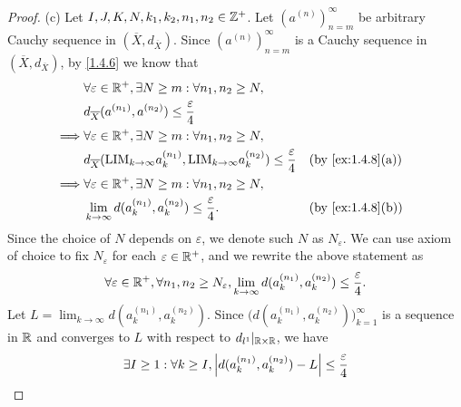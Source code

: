 \begin{proof}{(c)}
  Let \(I, J, K, N, k_1, k_2, n_1, n_2 \in \mathbb{Z}^+\).
  Let \((a^{(n)})_{n = m}^\infty\) be arbitrary Cauchy sequence in \((\overline{X}, d_{\overline{X}})\).
  Since \((a^{(n)})_{n = m}^\infty\) is a Cauchy sequence in \((\overline{X}, d_{\overline{X}})\), by \cref{1.4.6} we know that
  \begin{align*}
             & \forall \varepsilon \in \R^+, \exists N \geq m : \forall n_1, n_2 \geq N,                                                                                      \\
             & d_{\overline{X}}(a^{(n_1)}, a^{(n_2)}) \leq \dfrac{\varepsilon}{4}                                                                                             \\
    \implies & \forall \varepsilon \in \R^+, \exists N \geq m : \forall n_1, n_2 \geq N,                                                                                      \\
             & d_{\overline{X}}(\text{LIM}_{k \to \infty} a_k^{(n_1)}, \text{LIM}_{k \to \infty} a_k^{(n_2)}) \leq \dfrac{\varepsilon}{4} &  & \text{(by \cref{ex:1.4.8}(a))} \\
    \implies & \forall \varepsilon \in \R^+, \exists N \geq m : \forall n_1, n_2 \geq N,                                                                                      \\
             & \lim_{k \to \infty} d(a_k^{(n_1)}, a_k^{(n_2)}) \leq \dfrac{\varepsilon}{4}.                                               &  & \text{(by \cref{ex:1.4.8}(b))}
  \end{align*}
  Since the choice of \(N\) depends on \(\varepsilon\), we denote such \(N\) as \(N_\varepsilon\).
  We can use axiom of choice to fix \(N_\varepsilon\) for each \(\varepsilon \in \mathbb{R}^+\), and we rewrite the above statement as
  \[
    \forall \varepsilon \in \mathbb{R}^+, \forall n_1, n_2 \geq N_\varepsilon, \lim_{k \to \infty} d(a_k^{(n_1)}, a_k^{(n_2)}) \leq \dfrac{\varepsilon}{4}.
  \]
  Let \(L = \lim_{k \to \infty} d(a_k^{(n_1)}, a_k^{(n_2)})\).
  Since \(\Big(d(a_k^{(n_1)}, a_k^{(n_2)})\Big)_{k = 1}^\infty\) is a sequence in \(\mathbb{R}\) and converges to \(L\) with respect to \(d_{l^1}|_{\mathbb{R} \times \mathbb{R}}\), we have
  \begin{align*}
             & \exists I \geq 1 : \forall k \geq I, \abs{d(a_k^{(n_1)}, a_k^{(n_2)}) - L} \leq \dfrac{\varepsilon}{4}                                                                                              \\

\end{align*}
\end{proof}
